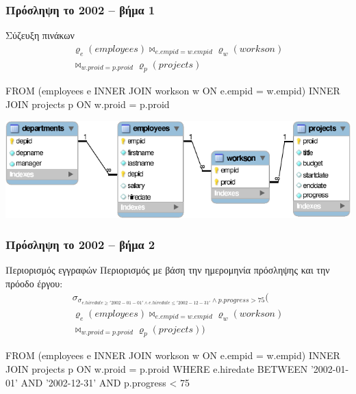 \begin{frame}
\frametitle{Πρόσληψη το 2002 -- βήμα 1}
\begin{minipage}{\wE}
\vspace{-0.5cm}
\begin{block}{\small Σύζευξη πινάκων}
\[
  \begin{split}
      \varrho_{e} (employees) \bowtie_{e.empid=w.empid} \varrho_{w} (workson)  \\
                              \bowtie_{w.proid=p.proid} \varrho_{p} (projects)
  \end{split}
\]
\vspace{-0.5cm}
\pause
\en
\begin{SQL}
    FROM (employees e INNER JOIN workson  w
                         ON e.empid = w.empid)
                      INNER JOIN projects p
                         ON w.proid = p.proid
\end{SQL}
\el
\end{block}
\includegraphics[scale=0.9]{../common/companyREL.pdf}
\end{minipage}
\end{frame}



\begin{frame}
\frametitle{Πρόσληψη το 2002 -- βήμα 2}
\begin{minipage}{\wE}
\vspace{-0.5cm}
  \begin{block}{\small Περιορισμός εγγραφών }
Περιορισμός με βάση την ημερομηνία πρόσληψης και την πρόοδο έργου:
\[
\begin{split}
      \sigma_{\sigma_{e.hiredate\geq'2002-01-01'\wedge e.hiredate\leq'2002-12-31'}
                      \wedge p.progress>75}
      (                           \\
        \varrho_{e} (employees) \bowtie_{e.empid=w.empid} \varrho_{w} (workson) \\
                                \bowtie_{w.proid=p.proid} \varrho_{p} (projects)
      )
\end{split}
\]
\pause
\vspace{-0.5cm}
\en
\begin{SQL}
    FROM (employees e INNER JOIN workson  w
                         ON e.empid = w.empid)
                      INNER JOIN projects p
                         ON w.proid = p.proid
   WHERE e.hiredate BETWEEN '2002-01-01' AND '2002-12-31'
     AND p.progress < 75
\end{SQL}
\el
\end{block}
\end{minipage}
\end{frame}



